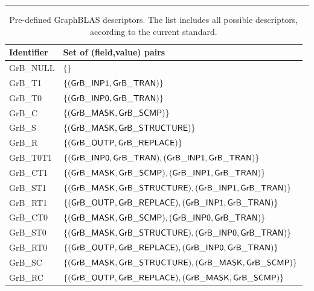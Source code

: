 \begin{table}[htbp]
    \hrule
    \begin{center}
	\caption{Pre-defined GraphBLAS descriptors. The list includes
	all possible descriptors, according to the current standard.}
	\label{Tab:DefaultDescriptors}

	\begin{small}
	    \begin{tabular}{l|l} 
		Identifier		& Set of (field,value) pairs \\ \hline
		{\sf GrB\_NULL}		& $\{                                                                         \}$	\\
		{\sf GrB\_T1}		& $\{ ({\sf GrB\_INP1},{\sf GrB\_TRAN})                                                   \}$ 	\\
		{\sf GrB\_T0}		& $\{ ({\sf GrB\_INP0},{\sf GrB\_TRAN})                                                   \}$ 	\\
		{\sf GrB\_C}		& $\{ ({\sf GrB\_MASK},{\sf GrB\_SCMP})                                                     \}$	\\
		{\sf GrB\_S}		& $\{ ({\sf GrB\_MASK},{\sf GrB\_STRUCTURE})                                                \}$	\\
		{\sf GrB\_R}		& $\{ ({\sf GrB\_OUTP},{\sf GrB\_REPLACE})                                                  \}$	\\
		{\sf GrB\_T0T1}		& $\{ ({\sf GrB\_INP0},{\sf GrB\_TRAN})   , ({\sf GrB\_INP1},{\sf GrB\_TRAN})                         \}$	\\
		{\sf GrB\_CT1}		& $\{ ({\sf GrB\_MASK},{\sf GrB\_SCMP})     , ({\sf GrB\_INP1},{\sf GrB\_TRAN})                         \}$	\\
		{\sf GrB\_ST1}		& $\{ ({\sf GrB\_MASK},{\sf GrB\_STRUCTURE}), ({\sf GrB\_INP1},{\sf GrB\_TRAN})                         \}$	\\
		{\sf GrB\_RT1}		& $\{ ({\sf GrB\_OUTP},{\sf GrB\_REPLACE})  , ({\sf GrB\_INP1},{\sf GrB\_TRAN})                         \}$	\\
		{\sf GrB\_CT0}		& $\{ ({\sf GrB\_MASK},{\sf GrB\_SCMP})     , ({\sf GrB\_INP0},{\sf GrB\_TRAN})                         \}$	\\
		{\sf GrB\_ST0}		& $\{ ({\sf GrB\_MASK},{\sf GrB\_STRUCTURE}), ({\sf GrB\_INP0},{\sf GrB\_TRAN})                         \}$	\\
		{\sf GrB\_RT0}		& $\{ ({\sf GrB\_OUTP},{\sf GrB\_REPLACE})  , ({\sf GrB\_INP0},{\sf GrB\_TRAN})                         \}$	\\
		{\sf GrB\_SC}		& $\{ ({\sf GrB\_MASK},{\sf GrB\_STRUCTURE}), ({\sf GrB\_MASK},{\sf GrB\_SCMP})                           \}$	\\
		{\sf GrB\_RC}		& $\{ ({\sf GrB\_OUTP},{\sf GrB\_REPLACE})  , ({\sf GrB\_MASK},{\sf GrB\_SCMP})                           \}$	\\

\end{tabular}
\end{small}
\end{center}
\end{table}

